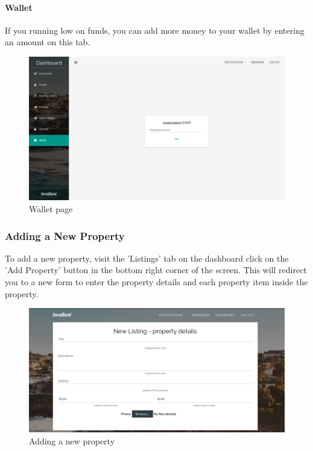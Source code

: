 \paragraph{Wallet}
If you running low on funds, you can add more money to your wallet by entering
an amount on this tab.
\begin{figure}[!h]
  \includegraphics[width=\linewidth]{assets/userManual/wallet.png}
  \caption{Wallet page}
  \label{fig:wallet}
\end{figure}

\subsubsection{Adding a New Property}
To add a new property, visit the 'Listings' tab on the dashboard click on the
'Add Property' button in the bottom right corner of the screen. This will
redirect you to a new form to enter the property details and each property item
inside the property.

\begin{figure}[!h]
  \includegraphics[width=\linewidth]{assets/userManual/newProperty.png}
  \caption{Adding a new property}
  \label{fig:newProperty}
\end{figure}

